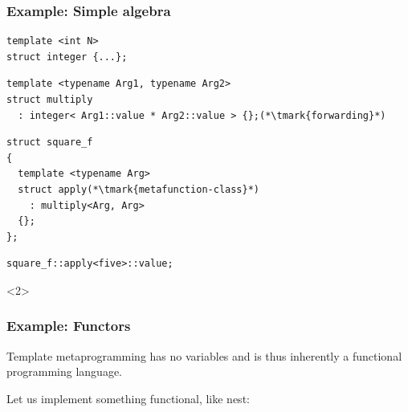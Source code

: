 \documentclass[14pt]{beamer}
\begin{document}
\begin{frame}[fragile]
  \frametitle{Example: Simple algebra}

  \begin{lstlisting}[basicstyle=\codefontsize{9pt}]
template <int N>
struct integer {...};
  \end{lstlisting}

  \begin{lstlisting}[basicstyle=\codefontsize{9pt}, morekeywords={integer}]
template <typename Arg1, typename Arg2>
struct multiply
  : integer< Arg1::value * Arg2::value > {};(*\tmark{forwarding}*)
  \end{lstlisting}

  \begin{lstlisting}[basicstyle=\codefontsize{9pt}, morekeywords={multiply}]
struct square_f
{
  template <typename Arg>
  struct apply(*\tmark{metafunction-class}*)
    : multiply<Arg, Arg>
  {};
};
  \end{lstlisting}

  \begin{lstlisting}[basicstyle=\codefontsize{9pt}, morekeywords={square_f}]
square_f::apply<five>::value;
  \end{lstlisting}

  \begin{onlyenv}<2>
    \nointerlineskip
  \end{onlyenv}
  
\end{frame}

\begin{frame}[fragile]
  \frametitle{Example: Functors}

  Template metaprogramming has no variables and is thus inherently a functional
  programming language.

  \vspace{.5cm}
  
  Let us implement something functional, like nest:

  \vspace{.5cm}

  \begin{center}
  \end{center}

\end{frame}
\end{document}
